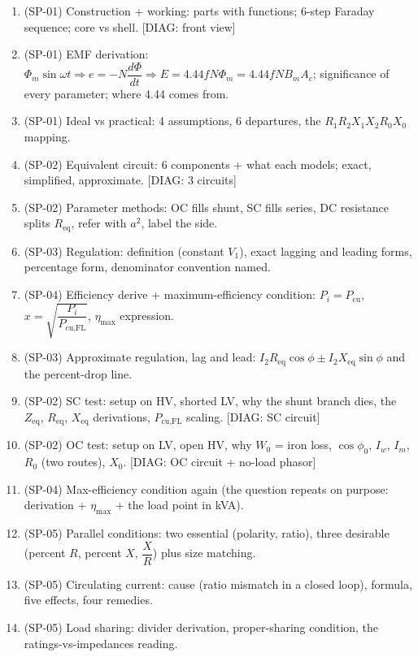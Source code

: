 \documentclass[11pt]{article}
\begin{document}
\begin{enumerate}[label=\textbf{Q\arabic*.}]
\item (SP-01) Construction + working: parts with functions; 6-step Faraday sequence; core vs shell. [DIAG: front view]
\item (SP-01) EMF derivation: $\Phi_m\sin\omega t \Rightarrow e = -N\dfrac{d\Phi}{dt} \Rightarrow E = 4.44 f N \Phi_m = 4.44 f N B_m A_c$; significance of every parameter; where 4.44 comes from.
\item (SP-01) Ideal vs practical: 4 assumptions, 6 departures, the $R_1 R_2 X_1 X_2 R_0 X_0$ mapping.
\item (SP-02) Equivalent circuit: 6 components + what each models; exact, simplified, approximate. [DIAG: 3 circuits]
\item (SP-02) Parameter methods: OC fills shunt, SC fills series, DC resistance splits $R_{\text{eq}}$, refer with $a^{2}$, label the side.
\item (SP-03) Regulation: definition (constant $V_1$), exact lagging and leading forms, percentage form, denominator convention named.
\item (SP-04) Efficiency derive + maximum-efficiency condition: $P_i = P_{\text{cu}}$, $x = \sqrt{\dfrac{P_i}{P_{\text{cu,FL}}}}$, $\eta_{\text{max}}$ expression.
\item (SP-03) Approximate regulation, lag and lead: $I_2 R_{\text{eq}}\cos\phi \pm I_2 X_{\text{eq}}\sin\phi$ and the percent-drop line.
\item (SP-02) SC test: setup on HV, shorted LV, why the shunt branch dies, the $Z_{\text{eq}}$, $R_{\text{eq}}$, $X_{\text{eq}}$ derivations, $P_{\text{cu,FL}}$ scaling. [DIAG: SC circuit]
\item (SP-02) OC test: setup on LV, open HV, why $W_0$ = iron loss, $\cos\phi_0$, $I_w$, $I_m$, $R_0$ (two routes), $X_0$. [DIAG: OC circuit + no-load phasor]
\item (SP-04) Max-efficiency condition again (the question repeats on purpose: derivation + $\eta_{\text{max}}$ + the load point in kVA).
\item (SP-05) Parallel conditions: two essential (polarity, ratio), three desirable (percent $R$, percent $X$, $\dfrac{X}{R}$) plus size matching.
\item (SP-05) Circulating current: cause (ratio mismatch in a closed loop), formula, five effects, four remedies.
\item (SP-05) Load sharing: divider derivation, proper-sharing condition, the ratings-vs-impedances reading.

\end{enumerate}
\end{document}
